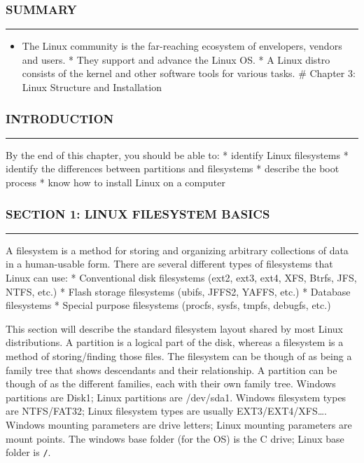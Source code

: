 \subsubsection{SUMMARY}\label{summary-1}

\begin{center}\rule{3in}{0.4pt}\end{center}

\begin{itemize}
\itemsep1pt\parskip0pt
\item
  The Linux community is the far-reaching ecosystem of envelopers,
  vendors and users. * They support and advance the Linux OS. * A Linux
  distro consists of the kernel and other software tools for various
  tasks. \# Chapter 3: Linux Structure and Installation
\end{itemize}

\subsubsection{INTRODUCTION}\label{introduction-2}

\begin{center}\rule{3in}{0.4pt}\end{center}

By the end of this chapter, you should be able to: * identify Linux
filesystems * identify the differences between partitions and
filesystems * describe the boot process * know how to install Linux on a
computer

\subsubsection{SECTION 1: LINUX FILESYSTEM
BASICS}\label{section-1-linux-filesystem-basics}

\begin{center}\rule{3in}{0.4pt}\end{center}

A filesystem is a method for storing and organizing arbitrary
collections of data in a human-usable form. There are several different
types of filesystems that Linux can use: * Conventional disk filesystems
(ext2, ext3, ext4, XFS, Btrfs, JFS, NTFS, etc.) * Flash storage
filesystems (ubifs, JFFS2, YAFFS, etc.) * Database filesystems * Special
purpose filesystems (procfs, sysfs, tmpfs, debugfs, etc.)

This section will describe the standard filesystem layout shared by most
Linux distributions. A partition is a logical part of the disk, whereas
a filesystem is a method of storing/finding those files. The filesystem
can be though of as being a family tree that shows descendants and their
relationship. A partition can be though of as the different families,
each with their own family tree. Windows partitions are Disk1; Linux
partitions are /dev/sda1. Windows filesystem types are NTFS/FAT32; Linux
filesystem types are usually EXT3/EXT4/XFS\ldots{}. Windows mounting
parameters are drive letters; Linux mounting parameters are mount
points. The windows base folder (for the OS) is the C drive; Linux base
folder is \texttt{/}.

